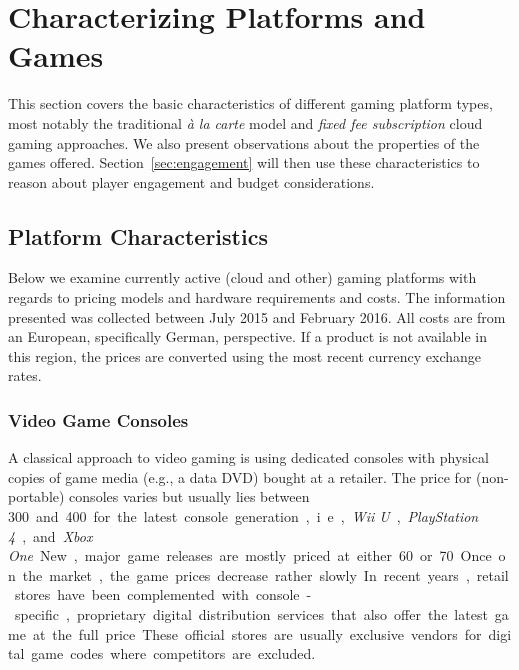 \section{Characterizing Platforms and Games}
\label{sec:background}

This section covers the basic characteristics of different gaming platform types, most notably the traditional  \textit{à la carte} model and \textit{fixed fee subscription} cloud gaming approaches. We also present observations about the properties of the games offered.
Section~\ref{sec:engagement} will then use these characteristics to reason about player engagement and budget considerations.

\subsection{Platform Characteristics}

Below we examine currently active (cloud and other) gaming platforms with regards to pricing models and hardware requirements and costs. The information presented was collected between July 2015 and February 2016. All costs are from an European, specifically German, perspective. If a product is not available in this region, the prices are converted using the most recent currency exchange rates.

\subsubsection{Video Game Consoles}

A classical approach to video gaming is using dedicated consoles with physical copies of game media (e.g., a data DVD) bought at a retailer. The price for (non-portable) consoles varies but usually lies between \SI{300}[\EUR] and \SI{400}[\EUR] for the latest console generation, i.e., \textit{Wii U}, \textit{PlayStation 4}, and \textit{Xbox One}. New, major game releases are mostly priced at either \SI{60}[\EUR] or \SI{70}[\EUR]. Once on the market, the game prices decrease rather slowly. In recent years, retail stores have been complemented with console-specific, proprietary digital distribution services that also offer the latest game at the full price. These official stores are usually exclusive vendors for digital game codes where competitors are excluded.

